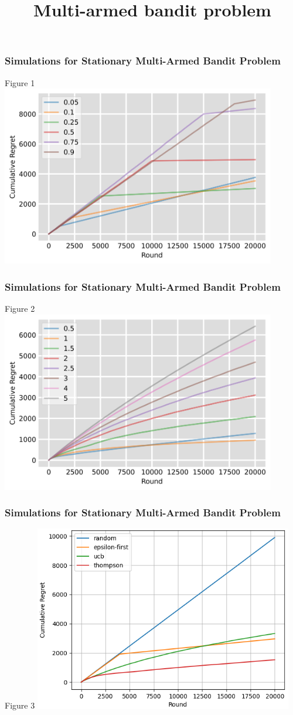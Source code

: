 \documentclass{beamer}
\title{Multi-armed bandit problem}
\subtitle{}
\author{}
\institute %
{}
\date %
{}
\begin{document}
    \begin{frame}
        \frametitle{Simulations for Stationary Multi-Armed Bandit Problem}
        Figure 1
        \includegraphics[width=0.9\textwidth]{../report/figures/epsilon_plot}
    \end{frame}

    \begin{frame}
        \frametitle{Simulations for Stationary Multi-Armed Bandit Problem}
        Figure 2
        \includegraphics[width=0.9\textwidth]{../report/figures/ucb_plot}
    \end{frame}


    \begin{frame}
        \frametitle{Simulations for Stationary Multi-Armed Bandit Problem}
        Figure 3
        \includegraphics[width=0.85\textwidth]{../report/figures/100machines}
    \end{frame}
\end{document}
